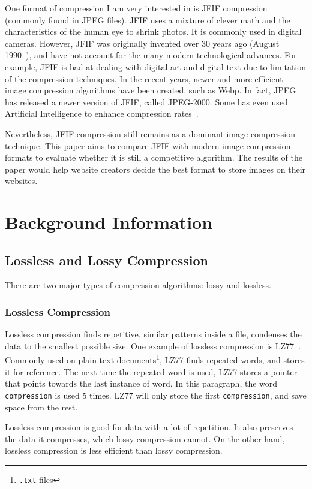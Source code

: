 \documentclass{article}
\begin{document}
One format of compression I am very interested in is JFIF compression (commonly found in JPEG files).
JFIF uses a mixture of clever math and the characteristics of the human eye to shrink photos.
It is commonly used in digital cameras.
However, JFIF was originally invented over 30 years ago (August 1990~\autocite{jpeg}), and have not account for the many modern technological advances.
For example, JFIF is bad at dealing with digital art and digital text due to limitation of the compression techniques.
In the recent years, newer and more efficient image compression algorithms have been created, such as Webp. 
In fact, JPEG has released a newer version of JFIF, called JPEG-2000.
Some has even used Artificial Intelligence to enhance compression rates~\autocite{googleAI}.

Nevertheless, JFIF compression still remains as a dominant image compression technique.
This paper aims to compare JFIF with modern image compression formats to evaluate whether it is still a competitive algorithm.
The results of the paper would help website creators decide the best format to store images on their websites.

\section{Background Information}

\subsection{Lossless and Lossy Compression}
\noindent There are two major types of compression algorithms: lossy and lossless.

\subsubsection{Lossless Compression}
Lossless compression finds repetitive, similar patterns inside a file, condenses the data to the smallest possible size.
One example of lossless compression is LZ77~\autocite{lzYT}.
Commonly used on plain text documents\footnote{\texttt{.txt} files}, LZ77 finds repeated words, and stores it for reference.
The next time the repeated word is used, LZ77 stores a pointer that points towards the last instance of word.
In this paragraph, the word \texttt{compression} is used 5 times.
LZ77 will only store the first \texttt{compression}, and save space from the rest.

Lossless compression is good for data with a lot of repetition.
It also preserves the data it compresses, which lossy compression cannot.
On the other hand, lossless compression is less efficient than lossy compression.
\end{document}
